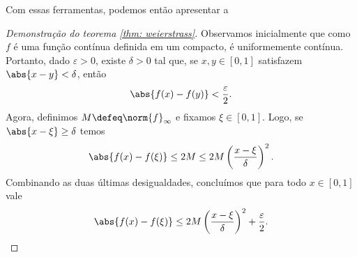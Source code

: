 Com essas ferramentas, podemos então apresentar a
 \begin{proof}[Demonstração do teorema \ref{thm: weierstrass}]
    Observamos inicialmente que como \( f \) é uma função contínua definida em um compacto, é uniformemente contínua.
    Portanto, dado \( \varepsilon > 0 \), existe \( \delta > 0 \) tal que, se \( x, y \in [0, 1] \) satisfazem \( \abs{ x - y } < \delta \), então \[
        \abs{ f(x) - f(y) } < \frac{ \varepsilon }{ 2 }
    .\]
    Agora, definimos \( M \defeq \norm{ f }_{ \infty } \) e fixamos \( \xi \in [0, 1] \).
    Logo, se \( \abs{ x - \xi } \geq \delta \) temos \[
        \abs{ f(x) - f(\xi) } \leq 2M \leq 2M \left( \frac{ x - \xi }{ \delta } \right)^2
    .\]
    Combinando as duas últimas desigualdades, concluímos que para todo \( x \in [0, 1] \) vale
    \begin{equation}
        \abs{ f(x) - f(\xi) } \leq 2M \left( \frac{ x - \xi }{ \delta } \right)^2 + \frac{ \varepsilon }{ 2 }
        \label{eq: weierstrass_bound_1}
    .\end{equation}


\end{proof}
